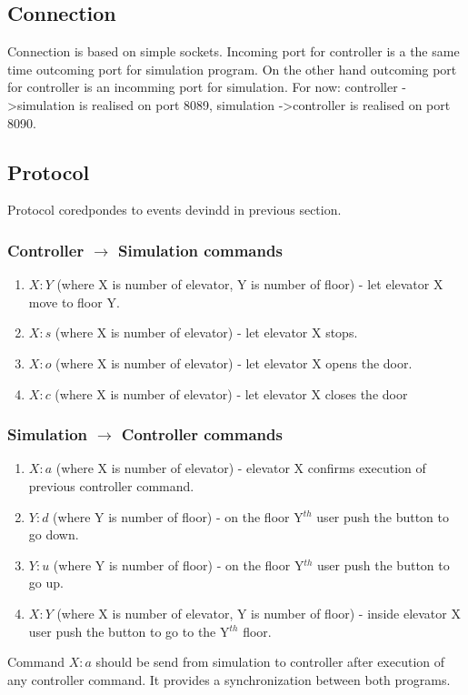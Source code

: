 \documentclass[12pt]{article}
\begin{document}
\subsection{Connection}
Connection is based on simple sockets. Incoming port for controller is a the same time outcoming port for simulation program. On the other hand outcoming port for controller is an incomming port for simulation.
\newline
\newline
For now:
\newline
controller -\textgreater simulation is realised on port 8089,
\newline
simulation -\textgreater controller is realised on port 8090.

\subsection{Protocol}
Protocol coredpondes to events devindd in previous section.

\subsubsection{Controller \(\to\) Simulation commands}
\begin{enumerate}
	\item $X:Y$ (where X is number of elevator, Y is number of floor) - let elevator X move to floor Y.
	\item $X:s$ (where X is number of elevator) - let elevator X stops.
	\item $X:o$ (where X is number of elevator) - let elevator X opens the door.
	\item $X:c$ (where X is number of elevator) - let elevator X closes the door
\end{enumerate}


\subsubsection{Simulation \(\to\) Controller commands}
\begin{enumerate}
	\item $X:a$ (where X is number of elevator) - elevator X confirms execution of previous controller command.
	\item $Y:d$ (where Y is number of floor) - on the floor Y$^{th}$ user push the button to go down.
	\item $Y:u$ (where Y is number of floor) - on the floor Y$^{th}$ user push the button to go up.
	\item $X:Y$ (where X is number of elevator, Y is number of floor) - inside elevator X user push the button to go to the Y$^{th}$ floor.
\end{enumerate}	

Command $X:a$ should be send from simulation to controller after execution of any controller command. It provides a synchronization between both programs.
\end{document}
